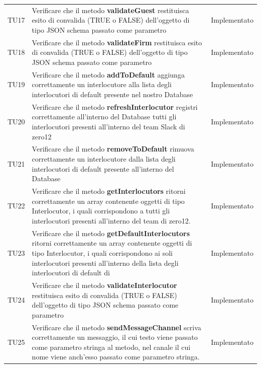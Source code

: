 \documentclass[../PianoDiQualifica_v4.0.0.tex]{subfiles}
\begin{document}
\begin{longtable}[c] { >{\centering\arraybackslash}p{2cm} p{9cm} >{\centering\arraybackslash}p{4cm}}
			\addlinespace[0.3em]
			\midrule
			\addlinespace[0.3em]
			TU17 & Verificare che il metodo \textbf{validateGuest} restituisca esito di convalida (TRUE o FALSE) dell'oggetto di tipo JSON schema passato come parametro & Implementato \\
			\addlinespace[0.3em]
			\midrule
			\addlinespace[0.3em]
			TU18 & Verificare che il metodo \textbf{validateFirm} restituisca esito di convalida (TRUE o FALSE) dell'oggetto di tipo JSON schema passato come parametro & Implementato \\
			\addlinespace[0.3em]
			\midrule
			\addlinespace[0.3em]
			TU19 & Verificare che il metodo \textbf{addToDefault} aggiunga correttamente un interlocutore alla lista degli interlocutori di default presente nel nostro Database & Implementato \\
			\addlinespace[0.3em]
			\midrule
			\addlinespace[0.3em]
			TU20 & Verificare che il metodo \textbf{refreshInterlocutor} registri correttamente all'interno del Database tutti gli interlocutori presenti all'interno del team Slack di zero12 & Implementato \\
			\addlinespace[0.3em]
			\midrule
			\addlinespace[0.3em]
			TU21 & Verificare che il metodo \textbf{removeToDefault} rimuova correttamente un interlocutore dalla lista degli interlocutori di default presente all'interno del Database & Implementato \\
			\addlinespace[0.3em]
			\midrule
			\addlinespace[0.3em]
			TU22 & Verificare che il metodo \textbf{getInterlocutors} ritorni correttamente un array contenente oggetti di tipo Interlocutor, i quali corrispondono a tutti gli interlocutori presenti all'interno del team di zero12. & Implementato \\
			\addlinespace[0.3em]
			\midrule
			\addlinespace[0.3em]
			TU23 & Verificare che il metodo \textbf{getDefaultInterlocutors} ritorni correttamente un array contenente oggetti di tipo Interlocutor, i quali corrispondono ai soli interlocutori presenti all'interno della lista degli interlocutori di default di \prop\ & Implementato \\
			\addlinespace[0.3em]
			\midrule
			\addlinespace[0.3em]
			TU24 & Verificare che il metodo \textbf{validateInterlocutor} restituisca esito di convalida (TRUE o FALSE) dell'oggetto di tipo JSON schema passato come parametro & Implementato \\
			\addlinespace[0.3em]
			\midrule
			\addlinespace[0.3em]
			TU25 & Verificare che il metodo \textbf{sendMessageChannel} scriva correttamente un messaggio, il cui testo viene passato come parametro stringa al metodo, nel canale il cui nome viene anch'esso passato come parametro stringa. & Implementato \\

\end{longtable}
\end{document}
